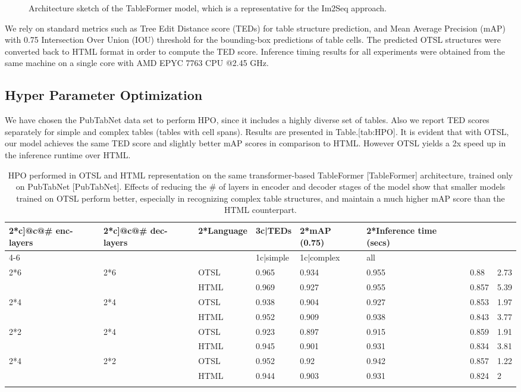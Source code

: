 \documentclass[11pt,a4paper]{article}
\begin{document}
\begin{figure}[h]
\caption{Architecture sketch of the TableFormer model, which is a representative for the Im2Seq approach.}
\end{figure}

We rely on standard metrics such as Tree Edit Distance score (TEDs) for table structure prediction, and Mean Average Precision (mAP) with 0.75 Intersection Over Union (IOU) threshold for the bounding-box predictions of table cells. The predicted OTSL structures were converted back to HTML format in order to compute the TED score. Inference timing results for all experiments were obtained from the same machine on a single core with AMD EPYC 7763 CPU @2.45 GHz.

\subsection{Hyper Parameter Optimization}

We have chosen the PubTabNet data set to perform HPO, since it includes a highly diverse set of tables. Also we report TED scores separately for simple and complex tables (tables with cell spans). Results are presented in Table.[tab:HPO]. It is evident that with OTSL, our model achieves the same TED score and slightly better mAP scores in comparison to HTML. However OTSL yields a 2x speed up in the inference runtime over HTML.

\begin{table}[h]
\caption{HPO performed in OTSL and HTML representation on the same transformer-based TableFormer [TableFormer] architecture, trained only on PubTabNet [PubTabNet]. Effects of reducing the \# of layers in encoder and decoder stages of the model show that smaller models trained on OTSL perform better, especially in recognizing complex table structures, and maintain a much higher mAP score than the HTML counterpart.}
\begin{tabular}{|l|l|l|l|l|l|l|l|}
\hline
2*c]@c@\# enc-layers & 2*c]@c@\# dec-layers & 2*Language & 3c|TEDs & 2*mAP (0.75) & 2*Inference time (secs) &  &  \\ \hline
4-6 &  &  & 1c|simple & 1c|complex & all &  &  \\ \hline
2*6 & 2*6 & OTSL & 0.965 & 0.934 & 0.955 & 0.88 & 2.73 \\ \hline
 &  & HTML & 0.969 & 0.927 & 0.955 & 0.857 & 5.39 \\ \hline
2*4 & 2*4 & OTSL & 0.938 & 0.904 & 0.927 & 0.853 & 1.97 \\ \hline
 &  & HTML & 0.952 & 0.909 & 0.938 & 0.843 & 3.77 \\ \hline
2*2 & 2*4 & OTSL & 0.923 & 0.897 & 0.915 & 0.859 & 1.91 \\ \hline
 &  & HTML & 0.945 & 0.901 & 0.931 & 0.834 & 3.81 \\ \hline
2*4 & 2*2 & OTSL & 0.952 & 0.92 & 0.942 & 0.857 & 1.22 \\ \hline
 &  & HTML & 0.944 & 0.903 & 0.931 & 0.824 & 2 \\ \hline
 &  &  &  &  &  &  &  \\ \hline
\end{tabular}
\end{table}
\end{document}
